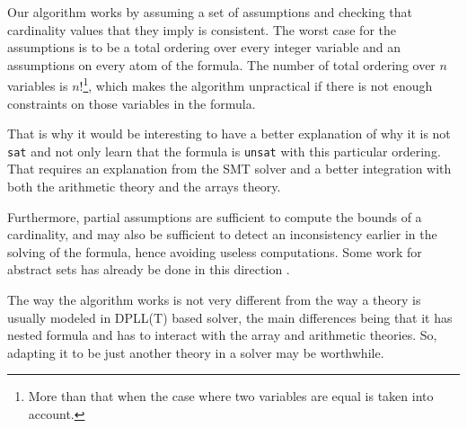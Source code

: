 Our algorithm works by assuming a set of assumptions and checking that
cardinality values that they imply is consistent. The worst case for the
assumptions is to be a total ordering over every integer variable and an
assumptions on every atom of the formula. The number of total ordering
over $n$ variables is
$n!$\footnote{More than that when the case where two variables are equal is taken into account.},
which makes the algorithm unpractical if there is not enough constraints
on those variables in the formula.

That is why it would be interesting to have a better explanation of why
it is not \texttt{sat} and not only learn that the formula is
\texttt{unsat} with this particular ordering. That requires an
explanation from the SMT solver and a better integration with both the
arithmetic theory and the arrays theory.

Furthermore, partial assumptions are sufficient to compute the bounds of
a cardinality, and may also be sufficient to detect an inconsistency
earlier in the solving of the formula, hence avoiding useless
computations. Some work for abstract sets has already be done in this
direction \cite{cardinalityset}.

The way the algorithm works is not very different from the way a theory
is usually modeled in DPLL(T) based solver, the main differences being
that it has nested formula and has to interact with the array and
arithmetic theories. So, adapting it to be just another theory in a
solver may be worthwhile.
